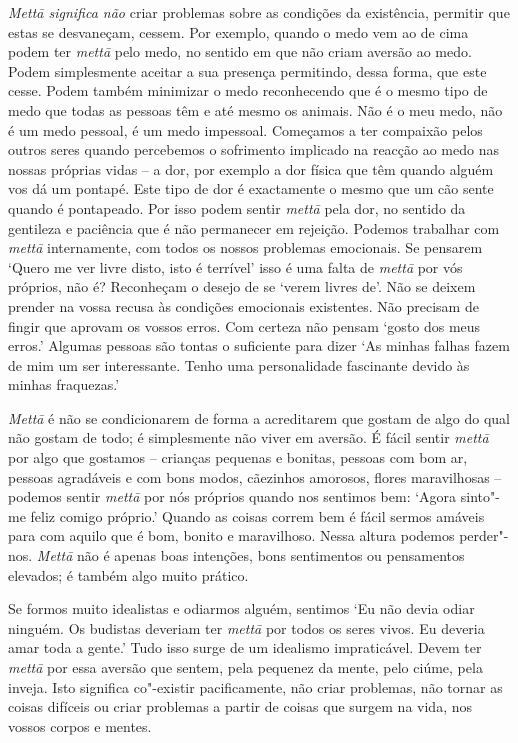 \emph{Mettā significa não} criar problemas sobre as condições da
existência, permitir que estas se desvaneçam, cessem. Por exemplo,
quando o medo vem ao de cima podem ter \emph{mettā} pelo medo, no
sentido em que não criam aversão ao medo. Podem simplesmente aceitar a
sua presença permitindo, dessa forma, que este cesse. Podem também
minimizar o medo reconhecendo que é o mesmo tipo de medo que todas as
pessoas têm e até mesmo os animais. Não é o meu medo, não é um medo
pessoal, é um medo impessoal. Começamos a ter compaixão pelos outros
seres quando percebemos o sofrimento implicado na reacção ao medo nas
nossas próprias vidas -- a dor, por exemplo a dor física que têm quando
alguém vos dá um pontapé. Este tipo de dor é exactamente o mesmo que um
cão sente quando é pontapeado. Por isso podem sentir \emph{mettā} pela
dor, no sentido da gentileza e paciência que é não permanecer em
rejeição. Podemos trabalhar com \emph{mettā} internamente, com todos os
nossos problemas emocionais. Se pensarem `Quero me ver livre disto, isto
é terrível' isso é uma falta de \emph{mettā} por vós próprios, não é?
Reconheçam o desejo de se `verem livres de'. Não se deixem prender na
vossa recusa às condições emocionais existentes. Não precisam de fingir
que aprovam os vossos erros. Com certeza não pensam `gosto dos meus
erros.' Algumas pessoas são tontas o suficiente para dizer `As minhas
falhas fazem de mim um ser interessante. Tenho uma personalidade
fascinante devido às minhas fraquezas.'

\emph{Mettā} é não se condicionarem de forma a acreditarem que gostam de
algo do qual não gostam de todo; é simplesmente não viver em aversão. É
fácil sentir \emph{mettā} por algo que gostamos -- crianças pequenas e
bonitas, pessoas com bom ar, pessoas agradáveis e com bons modos,
cãezinhos amorosos, flores maravilhosas -- podemos sentir \emph{mettā}
por nós próprios quando nos sentimos bem: `Agora sinto"-me feliz comigo
próprio.' Quando as coisas correm bem é fácil sermos amáveis para com
aquilo que é bom, bonito e maravilhoso. Nessa altura podemos perder"-nos.
\emph{Mettā} não é apenas boas intenções, bons sentimentos ou
pensamentos elevados; é também algo muito prático.

Se formos muito idealistas e odiarmos alguém, sentimos
`Eu não devia odiar ninguém. Os budistas deveriam ter \emph{mettā} por
todos os seres vivos. Eu deveria amar toda a gente.' Tudo isso surge de
um idealismo impraticável. Devem ter \emph{mettā} por essa aversão que
sentem, pela pequenez da mente, pelo ciúme, pela inveja. Isto significa
co"-existir pacificamente, não criar problemas, não tornar as coisas
difíceis ou criar problemas a partir de coisas que surgem na vida, nos
vossos corpos e mentes.

